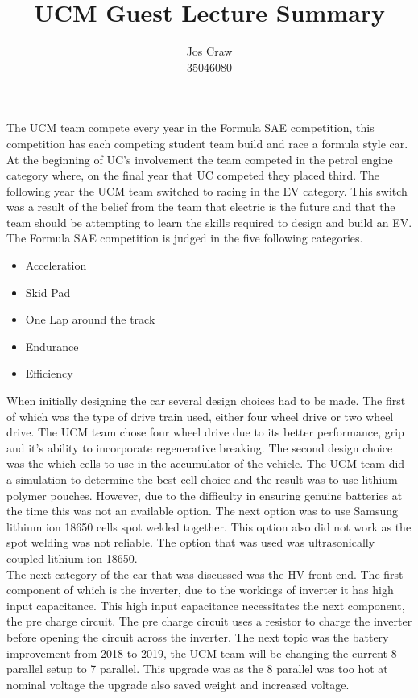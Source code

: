 \documentclass{article}
\title{UCM Guest Lecture Summary}
\author{Jos Craw\\ 35046080}
\begin{document}
\maketitle{}

The UCM team compete every year in the Formula SAE competition, this competition has each
competing student team build and race a formula style car. At the beginning of UC's involvement
the team competed in the petrol engine category where, on the final year that UC competed they
placed third. The following year the UCM team switched to racing in the EV category. This switch
was a result of the belief from the team that electric is the future and that the team should be
attempting to learn the skills required to design and build an EV. The Formula SAE competition is
judged in the five following categories.

\begin{itemize}
    \item{Acceleration}
    \item{Skid Pad}
    \item{One Lap around the track}
    \item{Endurance}
    \item{Efficiency}
\end{itemize}

When initially designing the car several design choices had to be made. The first of which was the
type of drive train used, either four wheel drive or two wheel drive. The UCM team chose four
wheel drive due to its better performance, grip and it's ability to incorporate regenerative
breaking. The second  design choice was the which cells to use in the accumulator of the vehicle.
The UCM team did a simulation to determine the best cell choice and the result was to use lithium
polymer pouches. However, due to the difficulty in ensuring genuine batteries at the time this was
not an available option. The next option was to use Samsung lithium ion 18650 cells spot welded
together. This option also did not work as the spot welding was not reliable. The option that was
used was ultrasonically coupled lithium ion 18650.\\

The next category of the car that was discussed was the HV front end. The first component of which
is the inverter, due to the workings of inverter it has high input capacitance. This high input
capacitance necessitates the next component, the pre charge circuit. The pre charge circuit uses a
resistor to charge the inverter before opening the circuit across the inverter. The next topic was
the battery improvement from 2018 to 2019, the UCM team will be changing the current 8 parallel
setup to 7 parallel. This upgrade was as the 8 parallel was too hot at nominal voltage the upgrade
also saved weight and increased voltage.\\
\end{document}

